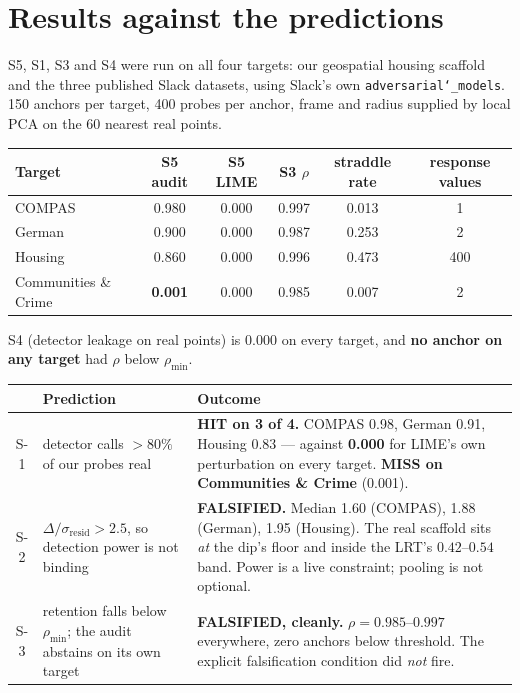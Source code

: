 \documentclass[11pt]{article}
\begin{document}
\section{Results against the predictions}

S5, S1, S3 and S4 were run on all four targets: our geospatial housing scaffold and the three
published Slack datasets, using Slack's own \texttt{adversarial\char`_models}. 150 anchors per
target, 400 probes per anchor, frame and radius supplied by local PCA on the 60 nearest real
points.

\begin{table}[h]
\small\centering
\begin{tabular}{@{}lccccc@{}}
\toprule
\textbf{\sffamily Target} & \textbf{S5} audit & \textbf{S5} LIME & \textbf{S3} $\rho$
  & straddle rate & response values\\
\midrule
COMPAS & 0.980 & 0.000 & 0.997 & 0.013 & 1\\
German & 0.900 & 0.000 & 0.987 & 0.253 & 2\\
Housing & 0.860 & 0.000 & 0.996 & 0.473 & 400\\
Communities \& Crime & \textbf{0.001} & 0.000 & 0.985 & 0.007 & 2\\
\bottomrule
\end{tabular}
\end{table}

\noindent S4 (detector leakage on real points) is $0.000$ on every target, and \textbf{no anchor
on any target} had $\rho$ below $\rho_{\min}$.

\begin{table}[h]
\small
\begin{tabular}{@{}clp{}@{}}
\toprule
& \textbf{\sffamily Prediction} & \textbf{\sffamily Outcome}\\
\midrule
S-1 & detector calls $>80\%$ of our probes real
    & \textbf{HIT on 3 of 4.} COMPAS 0.98, German 0.91, Housing 0.83 --- against
      \textbf{0.000} for LIME's own perturbation on every target.
      \textbf{MISS on Communities \& Crime} (0.001).\\
S-2 & $\Delta/\sigma_{\text{resid}} > 2.5$, so detection power is not binding
    & \textbf{FALSIFIED.} Median 1.60 (COMPAS), 1.88 (German), 1.95 (Housing).
      The real scaffold sits \emph{at} the dip's floor and inside the LRT's
      $0.42$--$0.54$ band. Power is a live constraint; pooling is not optional.\\
S-3 & retention falls below $\rho_{\min}$; the audit abstains on its own target
    & \textbf{FALSIFIED, cleanly.} $\rho = 0.985$--$0.997$ everywhere, zero anchors
      below threshold. The explicit falsification condition did \emph{not} fire.\\
\bottomrule
\end{tabular}
\end{table}
\end{document}
